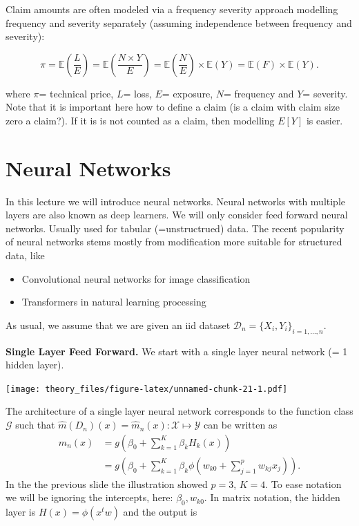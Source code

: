 \documentclass[a4paper,10pt,openany]{book}
\providecommand{\tightlist}{%
 \setlength{\itemsep}{0pt}\setlength{\parskip}{0pt}}
\begin{document}
Claim amounts are often modeled via a frequency severity approach modelling frequency and severity separately (assuming independence between frequency and severity):

\[
\pi=\mathbb{E}\left(\frac{L}{E}\right) = \mathbb{E}\left(\frac{N\times Y}{E}\right)= \mathbb{E}\left(\frac{N}{E}\right) \times  \mathbb{E}\left(Y\right)=\mathbb{E}(F) \times \mathbb{E}(Y).
\]

where \(\pi\)= technical price, \(L\)= loss, \(E\)= exposure, \(N\)= frequency and \(Y\)= severity. Note that it is important here how to define a claim (is a claim with claim size zero a claim?). If it is is not counted as a claim, then modelling \(E[Y]\) is easier.

\hypertarget{neural-networks}{%
\section{Neural Networks}\label{neural-networks}}

In this lecture we will introduce neural networks. Neural networks with multiple layers are also known as deep learners. We will only consider feed forward neural networks. Usually used for tabular (=unstructrued) data. The recent popularity of neural networks stems mostly from modification more suitable for structured data, like

\begin{itemize}
\tightlist
\item
  Convolutional neural networks for image classification
\item
  Transformers in natural learning processing
\end{itemize}

As usual, we assume that we are given an iid dataset \(\mathcal D_n=\{X_i,Y_i\}_{i=1,\dots,n}\).

\textbf{Single Layer Feed Forward.} We start with a single layer neural network (= 1 hidden layer).

\texttt{[image: theory\_files/figure-latex/unnamed-chunk-21-1.pdf]}

The architecture of a single layer neural network corresponds to
the function class \(\mathcal G\) such that
\(\hat m(D_n)(x)=\hat m_n(x): \mathcal X \mapsto \mathcal Y\) can be written as
\begin{align}
\hat m_n(x)&=g\left(\beta_0 + \sum_{k=1}^{K} \beta_kH_k(x)\right)\\
&= g\left(\beta_0 + \sum_{k=1}^{K} \beta_k\phi\left(w_{k0} + \sum_{j=1}^p w_{kj}x_j\right)\right).
\end{align}
In the the previous slide the illustration showed \(p=3\), \(K=4\). To ease notation we will be ignoring the intercepts, here: \(\beta_0, w_{k0}\). In matrix notation, the hidden layer is \(H(x)=\phi(x^tw)\) and the output is
\end{document}
